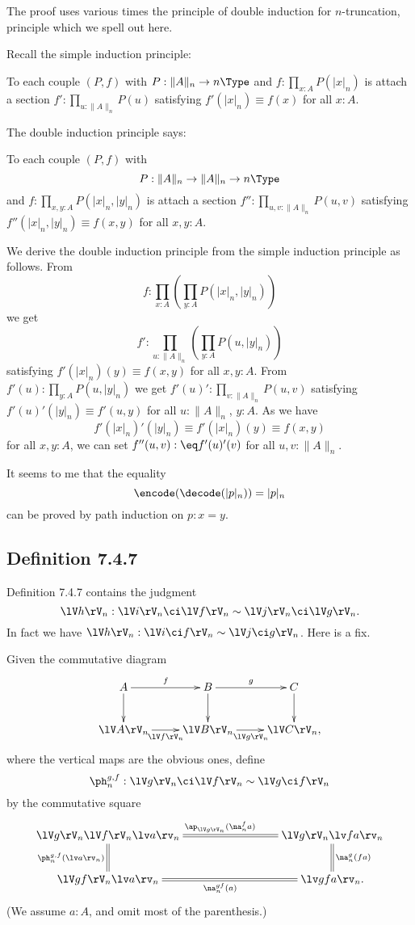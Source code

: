 \documentclass[12pt]{article}
\begin{document}
The proof uses various times the principle of double induction for $n$-truncation, principle which we spell out here.

Recall the simple induction principle:

To each couple $(P,f)$ with $P:\lVert A\rVert_n\to n\Type$ and $f:\prod_{x:A}P(\lvert x\rvert_n)$ is attach a section $f':\prod_{u:\lVert A\rVert_n}P(u)$ satisfying $f'(\lvert x\rvert_n)\equiv f(x)$ for all $x:A$.

The double induction principle says:

To each couple $(P,f)$ with $$P:\lVert A\rVert_n\to\lVert A\rVert_n\to n\Type$$ and $f:\prod_{x,y:A}P(\lvert x\rvert_n,\lvert y\rvert_n)$ is attach a section $f'':\prod_{u,v:\lVert A\rVert_n}P(u,v)$ satisfying $f''(\lvert x\rvert_n,\lvert y\rvert_n)\equiv f(x,y)$ for all $x,y:A$.

We derive the double induction principle from the simple induction principle as follows. From 
$$
f:\prod_{x:A}\left(\prod_{y:A}P(\lvert x\rvert_n,\lvert y\rvert_n)\right)
$$ 
we get 
$$
f':\prod_{u:\lVert A\rVert_n}\left(\prod_{y:A}P(u,\lvert y\rvert_n)\right)
$$ 
satisfying $f'(\lvert x\rvert_n)(y)\equiv f(x,y)$ for all $x,y:A$. From $f'(u):\prod_{y:A}P(u,\lvert y\rvert_n)$ we get $f'(u)':\prod_{v:\lVert A\rVert_n}P(u,v)$ satisfying $f'(u)'(\lvert y\rvert_n)\equiv f'(u,y)$ for all $u:\lVert A\rVert_n$, $y:A$. As we have 
$$
f'(\lvert x\rvert_n)'(\lvert y\rvert_n)\equiv f'(\lvert x\rvert_n)(y)\equiv f(x,y) 
$$ 
for all $x,y:A$, we can set $f''(u,v):\eq f'(u)'(v)$ for all $u,v:\lVert A\rVert_n$. 

It seems to me that the equality 
$$
\encode(\decode(\lvert p\rvert_n))=\lvert p\rvert_n
$$ 
can be proved by path induction on $p:x=y$.


\subsection{Definition 7.4.7}\label{747}

Definition 7.4.7 contains the judgment 
$$
\lV h\rV_n:\lV i\rV_n\ci\lV f\rV_n\sim\lV j\rV_n\ci\lV g\rV_n.
$$ 
In fact we have $\lV h\rV_n:\lV i\ci f\rV_n\sim\lV j\ci g\rV_n$. Here is a fix. 

Given the commutative diagram
$$
\xymatrix{
A\ar[r]^f\ar[d]&B\ar[r]^g\ar[d]&C\ar[d]\\
\lV A\rV_n\ar[r]_{\lV f\rV_n}&\lV B\rV_n\ar[r]_{\lV g\rV_n}&\lV C\rV_n,}
$$ 
where the vertical maps are the obvious ones, define 
$$
\ph_n^{g,f}:\lV g\rV_n\ci\lV f\rV_n\sim\lV g\ci f\rV_n
$$ 
by the commutative square 
$$
\xymatrix{
\lV g\rV_n\lV f\rV_n\lv a\rv_n\ar@{=}[d]_{\ph_n^{g,f}(\lv a\rv_n)}\ar@{=}[rrr]^{\ap_{\lV g\rV_n}(\na_n^fa)}&&&
\lV g\rV_n\lv fa\rv_n\ar@{=}[d]^{\na_n^g(fa)}\\
\lV gf\rV_n\lv a\rv_n\ar@{=}[rrr]_{\na_n^{gf}(a)}&&&\lv gfa\rv_n.}
$$ 
(We assume $a:A$, and omit most of the parenthesis.)
\end{document}
